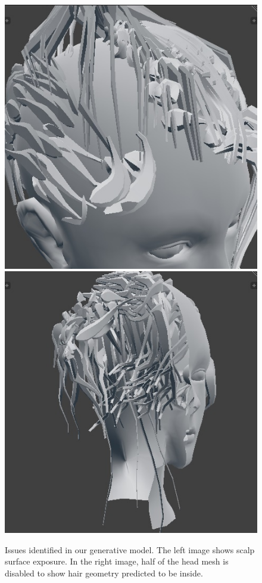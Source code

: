 \documentclass[ %
author={Dillon Keith Diep},
supervisor={Dr. Carl Henrik Ek},
degree={MEng},
title={ART-CG Hair:},
subtitle={Assisted Real-time Content Generation of Stylised Virtual Hair},
type={Research},
year={2017} ]{dissertation}
\begin{document}
	\begin{figure}[!h]
		\centering
		\caption{Issues identified in our generative model. The left image shows scalp surface exposure. In the right image, half of the head mesh is disabled to show hair geometry predicted to be inside.}
		\includegraphics[scale=0.4]{images/baldHair}
		\includegraphics[scale=0.4]{images/intersectHair}
		\label{fig:genIssues}
	\end{figure}
	
\end{document}
